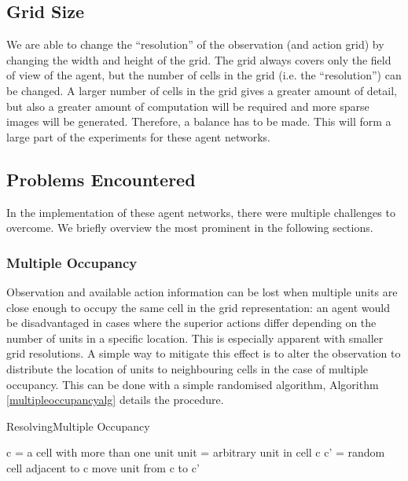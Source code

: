 \subsection{Grid Size}

We are able to change the ``resolution'' of the observation (and action grid) by changing the width and height of the grid. The grid always covers only the field of view of the agent, but the number of cells in the grid (i.e. the ``resolution'') can be changed.  A larger number of cells in the grid gives a greater amount of detail, but also a greater amount of computation will be required and more sparse images will be generated. Therefore, a balance has to be made. This will form a large part of the experiments for these agent networks.





\subsection{Problems Encountered}
In the implementation of these agent networks, there were multiple challenges to overcome. We briefly overview the most prominent in the following sections.

\subsubsection{Multiple Occupancy}
Observation and available action information can be lost when multiple units are close enough to occupy the same cell in the grid representation: an agent would be disadvantaged in cases where the superior actions differ depending on the number of units in a specific location. This is especially apparent with smaller grid resolutions. A simple way to mitigate this effect is to alter the observation to distribute the location of units to neighbouring cells in the case of multiple occupancy. This can be done with a simple randomised algorithm, Algorithm \ref{multipleoccupancyalg} details the procedure.

\begin{algorithm}
    \caption{ResolvingMultiple Occupancy}
    \label{multipleoccupancyalg}
    \begin{algorithmic}
        \State c = a cell with more than one unit
        \State unit = arbitrary unit in cell c
        \State c' = random cell adjacent to c
        \State move unit from c to c'
        \EndWhile
        
        \EndProcedure
      
        
        
    \end{algorithmic}
    
\end{algorithm}

